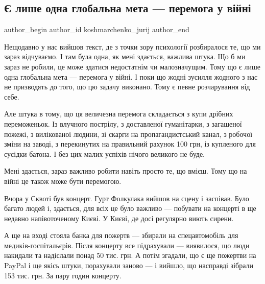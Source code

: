  
 
 
 
 
 
\subsection{Є лише одна глобальна мета — перемога у війні}
\label{sec:10_04_2022.fb.koshmarchenko_jurij.1.meta_peremoga}
 
\ifcmt
 author_begin
   author_id koshmarchenko_jurij
 author_end
\fi

Нещодавно у нас вийшов текст, де з точки зору психології розбиралося те, що ми
зараз відчуваємо. І там була одна, як мені здається, важлива штука. Що б ми
зараз не робили, це може здатися недостатнім чи малозначущим. Тому що є лише
одна глобальна мета — перемога у війні. І поки що жодні зусилля жодного з нас
не призводять до того, що цю задачу виконано. Тому є певне розчарування від
себе.

Але штука в тому, що ця величезна перемога складається з купи дрібних
переможеньок. Із влучного пострілу, з доставленої гуманітарки, з загашеної
пожежі, з вилікованої людини, зі скарги на пропагандистський канал, з робочої
зміни на заводі, з перекинутих на правильний рахунок 100 грн, із купленого для
сусідки батона. І без цих малих успіхів нічого великого не буде.

Мені здається, зараз важливо робити навіть просто те, що вмієш. Тому що на
війні це також може бути перемогою.

Вчора у Сквоті був концерт. Гурт Фолкулака вийшов на сцену і заспівав. Було
багато людей і, здається, для всіх це було важливо — побувати на концерті в ще
недавно напівоточеному Києві. У Києві, де досі регулярно виють сирени.

А ще на вході стояла банка для пожертв — збирали на спецавтомобіль для
медиків-госпітальєрів. Після концерту все підрахували — виявилося, що люди
накидали та надіслали понад 50 тис. грн. А потім згадали, що є ще пожертви на
PayPal і ще якісь штуки, порахували заново — і вийшло, що насправді зібрали 153
тис. грн. За пару годин концерту.

